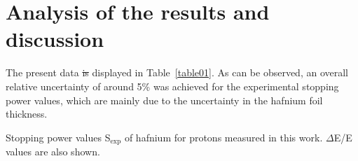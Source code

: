 \documentclass[aps,pra,reprint,superscriptaddress]{revtex4-1}
\providecommand{\DIFadd}[1]{{\protect\color{blue}\uwave{#1}}} %
\providecommand{\DIFdel}[1]{{\protect\color{red}\sout{#1}}}                      %
\providecommand{\DIFaddbegin}{} %
\providecommand{\DIFaddend}{} %
\providecommand{\DIFdelbegin}{} %
\providecommand{\DIFdelend}{} %
\newcommand{\DIFscaledelfig}{0.5}
\newlength{\DIFdelgraphicswidth} %
\newlength{\DIFdelgraphicsheight} %
\newcommand{\DIFaddincludegraphics}[2][]{{\color{blue}\fbox{\DIFOincludegraphics[#1]{#2}}}} %
\newcommand{\DIFdelincludegraphics}[2][]{%
\sbox{\DIFdelgraphicsbox}{\DIFOincludegraphics[#1]{#2}}%
\settoboxwidth{\DIFdelgraphicswidth}{\DIFdelgraphicsbox} %
\settoboxtotalheight{\DIFdelgraphicsheight}{\DIFdelgraphicsbox} %
\scalebox{\DIFscaledelfig}{%
\parbox[b]{\DIFdelgraphicswidth}{\usebox{\DIFdelgraphicsbox}\\[-\baselineskip] \rule{\DIFdelgraphicswidth}{0em}}\llap{\resizebox{\DIFdelgraphicswidth}{\DIFdelgraphicsheight}{%
\setlength{\unitlength}{\DIFdelgraphicswidth}%
\begin{picture}(1,1)%
\thicklines\linethickness{2pt} %
{\color[rgb]{1,0,0}\put(0,0){\framebox(1,1){}}}%
{\color[rgb]{1,0,0}\put(0,0){\line( 1,1){1}}}%
{\color[rgb]{1,0,0}\put(0,1){\line(1,-1){1}}}%
\end{picture}%
}\hspace*{3pt}}} %
} %
\DeclareRobustCommand{\DIFaddbegin}{\DIFOaddbegin \let\includegraphics\DIFaddincludegraphics} %
\DeclareRobustCommand{\DIFaddend}{\DIFOaddend \let\includegraphics\DIFOincludegraphics} %
\DeclareRobustCommand{\DIFdelbegin}{\DIFOdelbegin \let\includegraphics\DIFdelincludegraphics} %
\DeclareRobustCommand{\DIFdelend}{\DIFOaddend \let\includegraphics\DIFOincludegraphics} %
\begin{document}
\section{Analysis of the results and discussion}
\label{discussion}

The present data \DIFdelbegin \DIFdel{is }\DIFdelend \DIFaddbegin \DIFadd{are }\DIFaddend displayed in Table~\ref{table01}. %
As can be 
observed, %
an overall relative uncertainty 
of around 5\% was achieved for the experimental stopping power values, 
which are mainly due to the uncertainty in the hafnium foil thickness. 

\begin{table}[!t]
\centering
\caption{Stopping power values S$_{\mathrm{exp}}$ of hafnium for protons 
measured in this work. $\Delta$E/E values are also shown.}
\label{table01}

\vspace{0.2cm}


\end{table}
\end{document}
